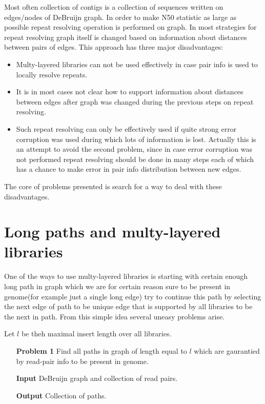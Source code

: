 \documentclass[a4paper,10pt]{article}
\begin{document}
Most often collection of contigs is a collection of sequences written on edges/nodes of DeBruijn graph. In order to make N50 statistic as large as possible repeat resolving operation is performed on graph. In most strategies for repeat resolving graph itself is changed based on information about distances between pairs of edges. This approach has three major disadvantages:
\begin{itemize}
\item Multy-layered libraries can not be used effectively in case pair info is used to locally resolve repeats.
\item It is in most cases not clear how to support information about distances between edges after graph was changed during the previous steps on repeat resolving.
\item Such repeat resolving can only be effectively used if quite strong error corruption was used during which lots of information is lost. Actually this is an attempt to avoid the second problem, since in case error corruption was not performed repeat resolving should be done in many steps each of which has a chance to make error in pair info distribution between new edges.
\end{itemize}

The core of problems presented is search for a way to deal with these disadvantages.

\section{Long paths and multy-layered libraries}

One of the ways to use multy-layered libraries is starting with certain enough long path in graph which we are for certain reason sure to be present in genome(for example just a single long edge) try to continue this path by selecting the next edge of path to be unique edge that is supported by all libraries to be the next in path. From this simple idea several uneasy problems arise.

Let $l$ be theh maximal insert length over all libraries.

\begin{itemize}
\item[\bf Problem 1] Find all paths in graph of length equal to $l$ which are gaurantied by read-pair info to be present in genome.
\item[\bf Input] DeBruijn graph and collection of read pairs.
\item[\bf Output] Collection of paths.
\end{itemize}
\end{document}
